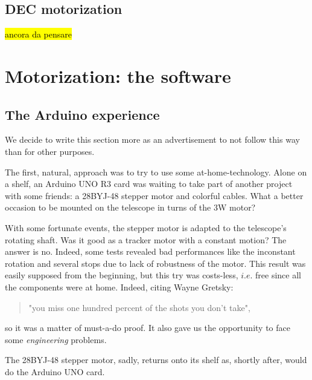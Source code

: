 \documentclass{article}
\begin{document}
\begin{multicols}{2}
\begin{minipage}{.5\textwidth}
            \label{fig:RA_mechanization}         
        \end{minipage}

        \subsection{DEC motorization}
        \hl{ancora da pensare}

        \section{Motorization: the software}
        \subsection{The Arduino experience}
        We decide to write this section more as an advertisement to not follow this way than for other purposes.

        The first, natural, approach was to try to use some at-home-technology.
        Alone on a shelf, an Arduino UNO R3 card was waiting to take part of another project with some friends: a 28BYJ-48 stepper motor and colorful cables.
        What a better occasion to be mounted on the telescope in turns of the 3W motor?

        With some fortunate events, the stepper motor is adapted to the telescope's rotating shaft.
        Was it good as a tracker motor with a constant motion?
        The answer is no.
        Indeed, some tests revealed bad performances like the inconstant rotation and several stops due to lack of robustness of the motor.
        This result was easily supposed from the beginning, but this try was costs-less, \(i.e.\) free since all the components were at home.
        Indeed, citing Wayne Gretsky:
        \begin{quote}
            "you miss one hundred percent of the shots you don't take",
        \end{quote}
        so it was a matter of must-a-do proof.
        It also gave us the opportunity to face some \textit{engineering} problems.

        The 28BYJ-48 stepper motor, sadly, returns onto its shelf as, shortly after, would do the Arduino UNO card.


\end{multicols}
\end{document}
